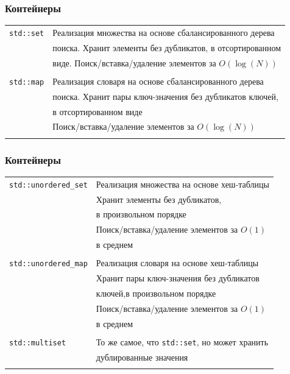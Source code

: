\documentclass[10pt,pdf,hyperref={unicode}]{beamer}
\begin{document}
\begin{frame}[fragile]
\frametitle{Контейнеры}
\begin{center}
\begin{tabular}{ l | l }
 \texttt{std::set} & Реализация множества на основе сбалансированного дерева  \\
				   & поиска. Хранит элементы без дубликатов, в отсортированном \\
                   & виде. Поиск/вставка/удаление элементов за $O(\log(N))$ \\ \\ \hline
 \texttt{std::map} & Реализация словаря на основе сбалансированного дерева  \\
				   & поиска. Хранит пары ключ-значения без дубликатов ключей, \\
				   & в отсортированном виде\\
                   & Поиск/вставка/удаление элементов за $O(\log(N))$ \\ \\ \hline
\end{tabular}
\end{center}
\end{frame}    
          
\begin{frame}[fragile]
\frametitle{Контейнеры}
\begin{center}
\begin{tabular}{ l | l }
 \texttt{std::unordered\_set} & Реализация множества на основе хеш-таблицы \\
				   & Хранит элементы без дубликатов, \\ &в произвольном порядке\\
                   & Поиск/вставка/удаление элементов за $O(1)$ \\ &в среднем \\ \\ \hline
 \texttt{std::unordered\_map} & Реализация словаря на основе хеш-таблицы \\
				   & Хранит пары ключ-значения без дубликатов \\&ключей,в произвольном порядке\\
                   & Поиск/вставка/удаление элементов за $O(1)$ \\&в среднем  \\ \\ \hline
 \texttt{std::multiset} & То же самое, что \texttt{std::set}, но может хранить \\&дублированные значения \\ \\ \hline
\end{tabular}
\end{center}
\end{frame}
\end{document}
